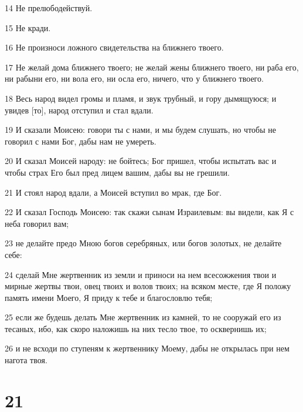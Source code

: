 \par 14 Не прелюбодействуй.
\par 15 Не кради.
\par 16 Не произноси ложного свидетельства на ближнего твоего.
\par 17 Не желай дома ближнего твоего; не желай жены ближнего твоего, ни раба его, ни рабыни его, ни вола его, ни осла его, ничего, что у ближнего твоего.
\par 18 Весь народ видел громы и пламя, и звук трубный, и гору дымящуюся; и увидев [то], народ отступил и стал вдали.
\par 19 И сказали Моисею: говори ты с нами, и мы будем слушать, но чтобы не говорил с нами Бог, дабы нам не умереть.
\par 20 И сказал Моисей народу: не бойтесь; Бог пришел, чтобы испытать вас и чтобы страх Его был пред лицем вашим, дабы вы не грешили.
\par 21 И стоял народ вдали, а Моисей вступил во мрак, где Бог.
\par 22 И сказал Господь Моисею: так скажи сынам Израилевым: вы видели, как Я с неба говорил вам;
\par 23 не делайте предо Мною богов серебряных, или богов золотых, не делайте себе:
\par 24 сделай Мне жертвенник из земли и приноси на нем всесожжения твои и мирные жертвы твои, овец твоих и волов твоих; на всяком месте, где Я положу память имени Моего, Я приду к тебе и благословлю тебя;
\par 25 если же будешь делать Мне жертвенник из камней, то не сооружай его из тесаных, ибо, как скоро наложишь на них тесло твое, то осквернишь их;
\par 26 и не всходи по ступеням к жертвеннику Моему, дабы не открылась при нем нагота твоя.

\chapter{21}

